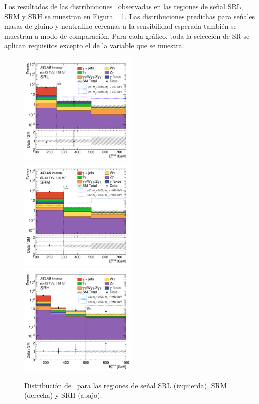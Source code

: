 Los resultados de las distribuciones \met\ observadas en las regiones de señal SRL, SRM y SRH se muestran en
Figura ~ \ref{fig:met_n-1_SRL_SRM_SRH_fr2}. Las distribuciones predichas para señales masas de gluino y neutralino
 cercanas a la sensibilidad esperada también se muestran a modo de comparación. Para cada gráfico, toda la selección de SR
se aplican requisitos excepto el de la variable que se muestra.

\begin{figure}[!hb]
   \begin{center}
   \includegraphics[width=0.5\textwidth]{images_tmp/sigReg_SRL_fr2_met_et.pdf}%
   \includegraphics[width=0.5\textwidth]{images_tmp/sigReg_SRM_fr2_met_et.pdf}
   \includegraphics[width=0.5\textwidth]{images_tmp/sigReg_SRH_fr2_met_et.pdf}
   \caption{Distribución de \met\ para las regiones de señal SRL (izquierda), SRM (derecha) y SRH (abajo).}
   \label{fig:met_n-1_SRL_SRM_SRH_fr2}
 \end{center}
\end{figure}

